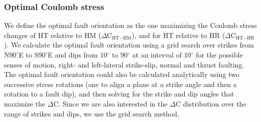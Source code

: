 \documentclass[draft,linenumbers]{agujournal2018}
\begin{document}
\subsubsection{Optimal Coulomb stress}
We define the optimal fault orientation as the one maximizing the Coulomb stress changes of HT relative to HM ($\Delta$C$_{\text{HT}-\text{HM}}$), and for HT relative to HR ($\Delta$C$_{\text{HT}-\text{HR}}$). We calculate the optimal fault orientation using a grid search over strikes from N$90^\circ$E to S$90^\circ$E and dips from 10$^\circ$ to 90$^\circ$ at an interval of $10^\circ$ for the possible senses of motion, right- and left-lateral strike-slip, normal and thrust faulting. The optimal fault orientation could also be calculated analytically using two successive stress rotations (one to align a plane at a strike angle and then a rotation to a fault dip), and then solving for the strike and dip angles that maximize the $\Delta$C. Since we are also interested in the $\Delta$C distribution over the range of strikes and dips, we use the grid search method.

\end{document}
